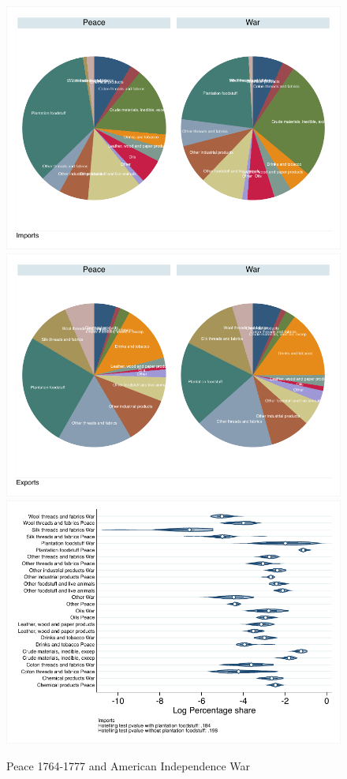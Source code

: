 \documentclass[12pt,a4paper,notitlepage,english]{article}
\begin{document}
\begin{figure}
\centering
\caption{Peace 1764-1777 and American Independence War}
\label{pre_independence_composition}
\includegraphics[scale=.63]{pre_independence_composition_I}
\includegraphics[scale=.63]{pre_independence_composition_X}
\vspace{0.7cm}
\includegraphics[scale=.63]{pre_independence_distribution_I}

\end{figure}
\end{document}
